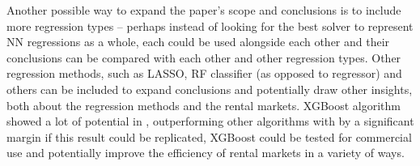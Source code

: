 \documentclass[12pt]{report}
\begin{document}
Another possible way to expand the paper's scope and conclusions is to include more regression types -- perhaps instead of looking for the best solver to represent NN regressions as a whole, each could be used alongside each other and their conclusions can be compared with each other and other regression types. Other regression methods, such as LASSO, RF classifier (as opposed to regressor) and others can be included to expand conclusions and potentially draw other insights, both about the regression methods and the rental markets. XGBoost algorithm showed a lot of potential in \cite{yoshida2022}, outperforming other algorithms with by a significant margin if this result could be replicated, XGBoost could be tested for commercial use and potentially improve the efficiency of rental markets in a variety of ways.

\printbibliography

\appendix
\end{document}
